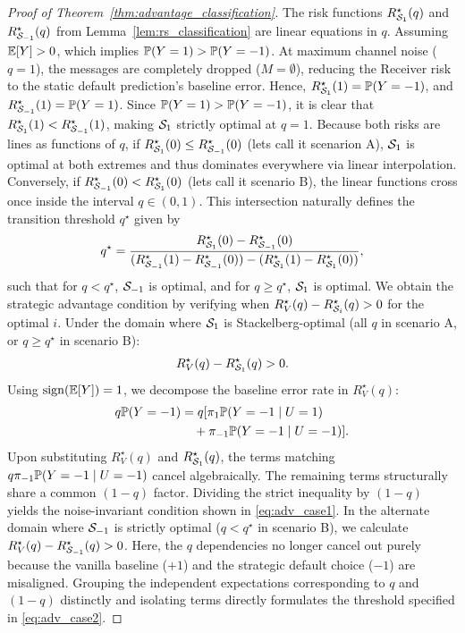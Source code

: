 \begin{proof}[Proof of Theorem~\ref{thm:advantage_classification}]
The risk functions $R_{\mathcal{S}_1}^\star(q)$ and $R_{\mathcal{S}_{-1}}^\star(q)$ from Lemma~\ref{lem:rs_classification} are linear equations in $q$. Assuming $\mathbb{E}[Y] > 0$, which implies $\mathbb{P}(Y=1) > \mathbb{P}(Y=-1)$. At maximum channel noise ($q=1$), the messages are completely dropped ($M = \emptyset$), reducing the Receiver risk to the static default prediction's baseline error. Hence, $R_{\mathcal{S}_{1}}^\star(1) = \mathbb{P}(Y=-1)$, and $R_{\mathcal{S}_{-1}}^\star(1) = \mathbb{P}(Y=1)$. Since $\mathbb{P}(Y=1) > \mathbb{P}(Y=-1)$, it is clear that $R_{\mathcal{S}_{1}}^\star(1) < R_{\mathcal{S}_{-1}}^\star(1)$, making $\mathcal{S}_1$ strictly optimal at $q=1$. Because both risks are lines as functions of $q$, if $R_{\mathcal{S}_{1}}^\star(0) \le R_{\mathcal{S}_{-1}}^\star(0)$ (lets call it scenarion A), $\mathcal{S}_{1}$ is optimal at both extremes and thus dominates everywhere via linear interpolation. Conversely, if $R_{\mathcal{S}_{-1}}^\star(0) < R_{\mathcal{S}_{1}}^\star(0)$ (lets call it scenario B), the linear functions cross once inside the interval $q \in (0,1)$. This intersection naturally defines the transition threshold $q^\star$ given by 
    \begin{align}
    q^\star = \frac{R_{\mathcal{S}_1}^\star(0) - R_{\mathcal{S}_{-1}}^\star(0)}{(R_{\mathcal{S}_{-1}}^\star(1) - R_{\mathcal{S}_{-1}}^\star(0)) - (R_{\mathcal{S}_1}^\star(1) - R_{\mathcal{S}_1}^\star(0))},
    \end{align}
such that for $q < q^\star$, $\mathcal{S}_{-1}$ is optimal, and for $q \ge q^\star$, $\mathcal{S}_{1}$ is optimal. We obtain the strategic advantage condition by verifying when $R_V^\star(q) - R_{\mathcal{S}_i}^\star(q) > 0$ for the optimal $i$. Under the domain where $\mathcal{S}_1$ is Stackelberg-optimal (all $q$ in scenario A, or $q \ge q^\star$ in scenario B):
\begin{align*}
  R_V^\star(q) - R_{\mathcal{S}_1}^\star(q) > 0.
\end{align*}
Using $\operatorname{sign}(\mathbb{E}[Y]) = 1$, we decompose the baseline error rate in $R_V^\star(q)$:
\begin{align*}
  q\mathbb{P}(Y=-1) &= q [ \pi_1 \mathbb{P}(Y=-1 \mid U=1) \\
  &\quad + \pi_{-1} \mathbb{P}(Y=-1 \mid U=-1) ].
\end{align*}
Upon substituting $R_V^\star(q)$ and $R_{\mathcal{S}_1}^\star(q)$, the terms matching $q\pi_{-1}\mathbb{P}(Y=-1 \mid U=-1)$ cancel algebraically. The remaining terms structurally share a common $(1-q)$ factor. Dividing the strict inequality by $(1-q)$ yields the noise-invariant condition shown in \eqref{eq:adv_case1}. In the alternate domain where $\mathcal{S}_{-1}$ is strictly optimal ($q < q^\star$ in scenario B), we calculate $R_V^\star(q) - R_{\mathcal{S}_{-1}}^\star(q) > 0$. Here, the $q$ dependencies no longer cancel out purely because the vanilla baseline ($+1$) and the strategic default choice ($-1$) are misaligned. Grouping the independent expectations corresponding to $q$ and $(1-q)$ distinctly and isolating terms directly formulates the threshold specified in \eqref{eq:adv_case2}.
\end{proof}

